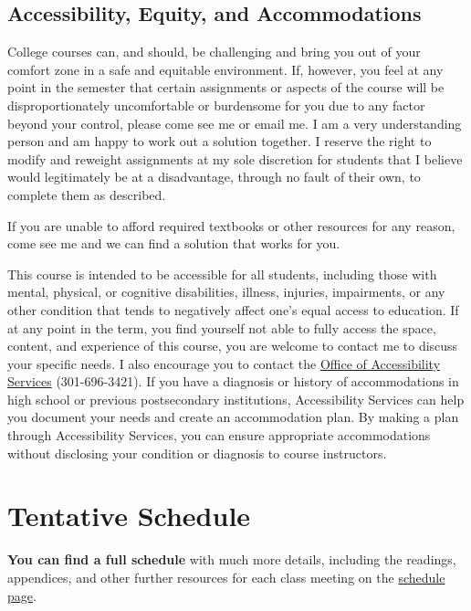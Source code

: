 \documentclass{article}
\begin{document}
\hypertarget{accessibility-equity-and-accommodations}{%
\subsection{Accessibility, Equity, and
Accommodations}\label{accessibility-equity-and-accommodations}}

College courses can, and should, be challenging and bring you out of
your comfort zone in a safe and equitable environment. If, however, you
feel at any point in the semester that certain assignments or aspects of
the course will be disproportionately uncomfortable or burdensome for
you due to any factor beyond your control, please come see me or email
me. I am a very understanding person and am happy to work out a solution
together. I reserve the right to modify and reweight assignments at my
sole discretion for students that I believe would legitimately be at a
disadvantage, through no fault of their own, to complete them as
described.

If you are unable to afford required textbooks or other resources for
any reason, come see me and we can find a solution that works for you.

This course is intended to be accessible for all students, including
those with mental, physical, or cognitive disabilities, illness,
injuries, impairments, or any other condition that tends to negatively
affect one's equal access to education. If at any point in the term, you
find yourself not able to fully access the space, content, and
experience of this course, you are welcome to contact me to discuss your
specific needs. I also encourage you to contact the
\href{https://www.hood.edu/academics/josephine-steiner-center-academic-achievement-retention/accessibility-services}{Office
of Accessibility Services} (301-696-3421). If you have a diagnosis or
history of accommodations in high school or previous postsecondary
institutions, Accessibility Services can help you document your needs
and create an accommodation plan. By making a plan through Accessibility
Services, you can ensure appropriate accommodations without disclosing
your condition or diagnosis to course instructors.

\hypertarget{tentative-schedule}{%
\section{Tentative Schedule}\label{tentative-schedule}}

\textbf{You can find a full schedule} with much more details, including
the readings, appendices, and other further resources for each class
meeting on the \href{schedule/}{schedule page}.
\end{document}
